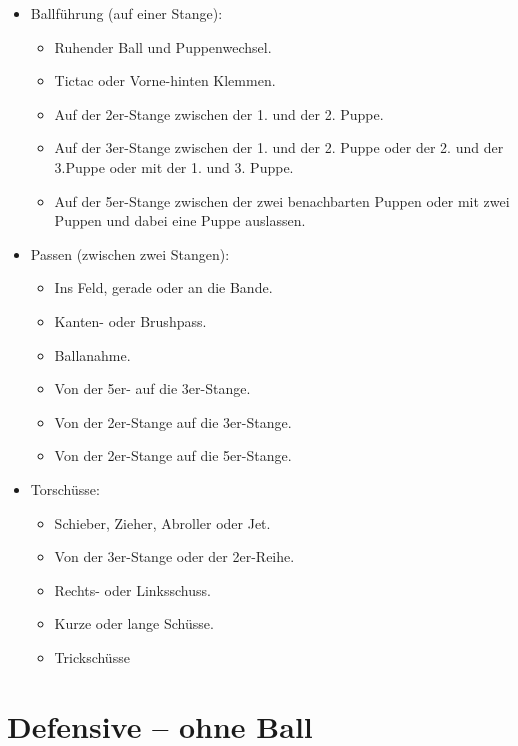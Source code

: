 \begin{itemize}
\item Ballführung (auf einer Stange): 
\begin{itemize}
\item Ruhender Ball und Puppenwechsel.
\item Tictac oder Vorne-hinten Klemmen.
\item Auf der 2er-Stange zwischen der 1. und der 2. Puppe.
\item Auf der 3er-Stange zwischen der 1. und der 2. Puppe oder der 2. und der 3.Puppe oder mit der 1. und 3. Puppe.
\item Auf der 5er-Stange zwischen der zwei benachbarten Puppen oder mit zwei Puppen und dabei eine Puppe auslassen.
\end{itemize}
\item Passen (zwischen zwei Stangen):
\begin{itemize}
\item Ins Feld, gerade oder an die Bande.
\item Kanten- oder Brushpass.
\item Ballanahme.
\item Von der 5er- auf die 3er-Stange.
\item Von der 2er-Stange auf die 3er-Stange.
\item Von der 2er-Stange auf die 5er-Stange.
\end{itemize}
\item Torschüsse: 
\begin{itemize}
\item Schieber, Zieher, Abroller oder Jet.
\item Von der 3er-Stange oder der 2er-Reihe.
\item Rechts- oder Linksschuss.
\item Kurze oder lange Schüsse.
\item Trickschüsse
\end{itemize}
\end{itemize}

\section{Defensive -- ohne Ball}
\label{technik:defensive}

